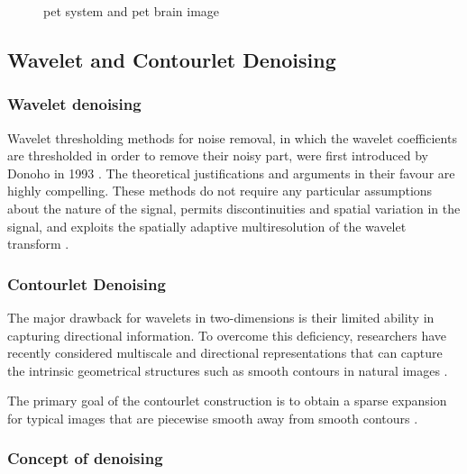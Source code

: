 \begin{figure}[h]
\begin{subfigure}[b]{0.35\textwidth}
		\label{fig:pet_brain}
	\end{subfigure}
	\caption{\gls{pet} system and \gls{pet} brain image}\label{fig:pet_image}
\end{figure}


\subsection{Wavelet and Contourlet Denoising}
\label{subsection:wavelet_denoising}

\subsubsection*{Wavelet denoising}
Wavelet thresholding methods for noise removal, in which the wavelet coefficients are
thresholded in order to remove their noisy part, were first introduced by Donoho in 1993 \cite{coifman1995translation}.
The theoretical justifications and arguments in their favour are highly compelling. These
methods do not require any particular assumptions about the nature of the signal, permits
discontinuities and spatial variation in the signal, and exploits the spatially adaptive
multiresolution of the wavelet transform \cite{cohen2012signal}.

\subsubsection*{Contourlet Denoising}
The major drawback for wavelets in two-dimensions is
their limited ability in capturing directional information. To
overcome this deficiency, researchers have recently considered multiscale and directional representations that can capture the
intrinsic geometrical structures such as smooth contours in
natural images \cite{Po2003}.

The primary goal of the contourlet construction is to obtain a sparse expansion for typical images that
are piecewise smooth away from smooth contours \cite{do2005contourlet}.

\subsubsection*{Concept of denoising}

